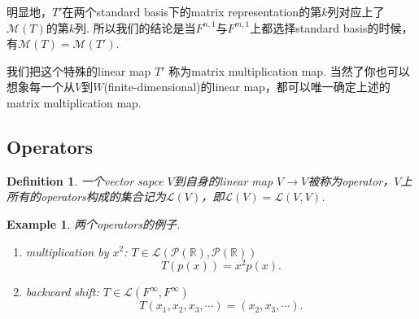 \documentclass{article}
\newtheorem{example}[theorem]{Example}
\newtheorem{definition}[theorem]{Definition}
\begin{document}
\begin{center}
\end{center}
明显地，$T'$在两个standard basis下的matrix representation的第$k$列对应上了$\mathcal{M}(T)$的第$k$列. {\color{blue}所以我们的结论是当$F^{n,1}$与$F^{m,1}$上都选择standard basis的时候，有$\mathcal{M}(T) = \mathcal{M}(T')$}.


我们把这个特殊的linear map $T'$ 称为{\color{red}matrix multiplication map}. 当然了你也可以想象每一个从$V$到$W$(finite-dimensional)的linear map，都可以唯一确定上述的matrix multiplication map.

\newpage
\subsection{Operators}

\begin{definition}
\rm 一个vector sapce $V$到自身的linear map $V \rightarrow V$被称为operator，$V$上所有的operators构成的集合记为$\mathcal{L}(V)$，即$\mathcal{L}(V)=\mathcal{L}(V,V)$.
\end{definition}

\begin{example}
两个operators的例子.
\begin{enumerate}
	\item multiplication by $x^2$: $T \in \mathcal{L}(\mathcal{P}(\mathbb{R}),\mathcal{P}(\mathbb{R}))$
	$$
		T(p(x)) = x^2p(x).
	$$
	\item backward shift: $T \in \mathcal{L}(F^{\infty},F^{\infty})$
	$$
		T(x_1,x_2,x_3,\cdots) = (x_2,x_3,\cdots). 
	$$
\end{enumerate}
\end{example}
\end{document}
